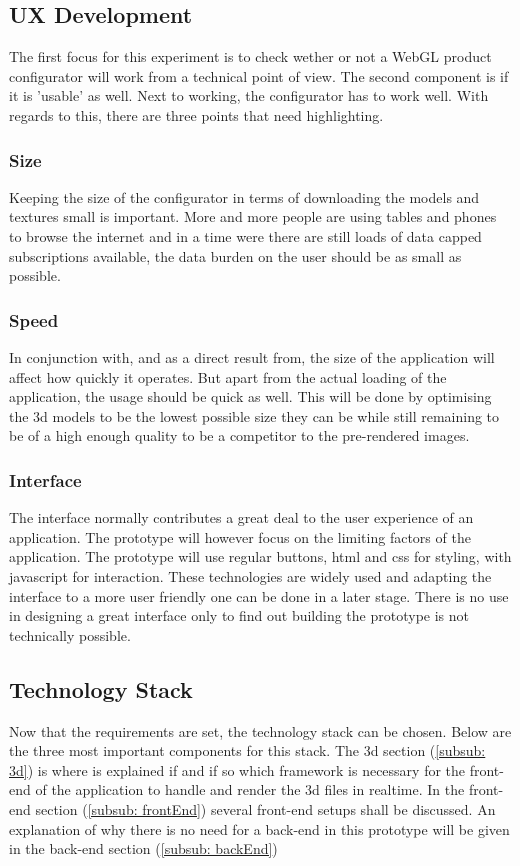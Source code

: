 \subsection{UX Development}
The first focus for this experiment is to check wether or not a WebGL product configurator will work from a technical point of view. The second component is if it is 'usable' as well. Next to working, the configurator has to work well. With regards to this, there are three points that need highlighting.
\subsubsection{Size}
Keeping the size of the configurator in terms of downloading the models and textures small is important. More and more people are using tables and phones to browse the internet and in a time were there are still loads of data capped subscriptions available, the data burden on the user should be as small as possible.

\subsubsection{Speed}
In conjunction with, and as a direct result from, the size of the application will affect how quickly it operates. But apart from the actual loading of the application, the usage should be quick as well. This will be done by optimising the 3d models to be the lowest possible size they can be while still remaining to be of a high enough quality to be a competitor to the pre-rendered images.

\subsubsection{Interface}
The interface normally contributes a great deal to the user experience of an application. The prototype will however focus on the limiting factors of the application. The prototype will use regular buttons, html and css for styling, with javascript for interaction. These technologies are widely used and adapting the interface to a more user friendly one can be done in a later stage. There is no use in designing a great interface only to find out building the prototype is not technically possible.

\subsection{Technology Stack}
Now that the requirements are set, the technology stack can be chosen. Below are the three most important components for this stack. The 3d section (\ref{subsub: 3d}) is where is explained if and if so which framework is necessary for the front-end of the application to handle and render the 3d files in realtime. In the front-end section (\ref{subsub: frontEnd}) several front-end setups shall be discussed. An explanation of why there is no need for a back-end in this prototype will be given in the back-end section (\ref{subsub: backEnd})

